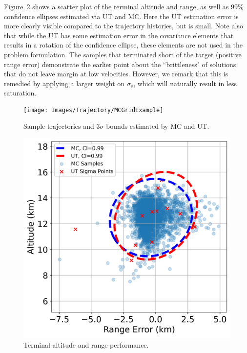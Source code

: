 Figure~\ref{Fig:DetailedScatter} shows a scatter plot of the terminal altitude and range, as well as 99\% confidence ellipses estimated via UT and MC. Here the UT estimation error is more clearly visible compared to the trajectory histories, but is small. Note also that while the UT has some estimation error in the covariance elements that results in a rotation of the confidence ellipse, these elements are not used in the problem formulation. The samples that terminated short of the target (positive range error) demonstrate the earlier point about the ``brittleness" of solutions that do not leave margin at low velocities. However, we remark that this is remedied by applying a larger weight on $\sigma_s$, which will naturally result in less saturation. 
\begin{figure}[h!]
	\centering
	\texttt{[image: Images/Trajectory/MCGridExample]}
	\caption{Sample trajectories and 3$\sigma$ bounds estimated by MC and UT.}
	\label{Fig:DetailedTrajectory}
\end{figure}
\begin{figure}[h!]
	\centering
	\includegraphics[width=1\textwidth]{Images/Trajectory/AltitudeRangeScatterExample}
	\caption{Terminal altitude and range performance.}
	\label{Fig:DetailedScatter}
\end{figure}

